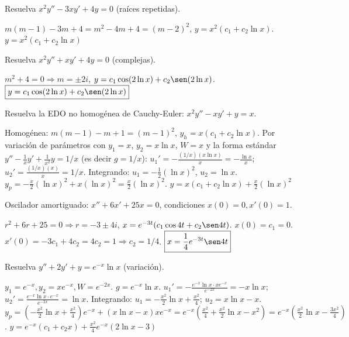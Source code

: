 \begin{prob}
Resuelva $x^2 y'' - 3x y' + 4y = 0$ (raíces repetidas).
\begin{myproof}
$m(m-1)-3m+4=m^2-4m+4=(m-2)^2$, $y=x^2(c_1+c_2\ln x)$. $\boxed{y=x^2(c_1+c_2\ln x)}$
\end{myproof}
\end{prob}

\begin{prob}
Resuelva $x^2 y'' + x y' + 4y = 0$ (complejas).
\begin{myproof}
$m^2+4=0 \Rightarrow m=\pm 2i$, $y=c_1\cos(2\ln x)+c_2\sen(2\ln x)$. $\boxed{y=c_1\cos(2\ln x)+c_2\sen(2\ln x)}$
\end{myproof}
\end{prob}

\begin{prob}
Resuelva la EDO no homogénea de Cauchy-Euler: $x^2 y'' - x y' + y = x$.
\begin{myproof}
Homogénea: $m(m-1)-m+1=(m-1)^2$, $y_h=x(c_1+c_2\ln x)$. Por variación de parámetros con $y_1=x$, $y_2=x\ln x$, $W=x$ y la forma estándar $y''-\frac{1}{x}y'+\frac{1}{x^2}y=1/x$ (es decir $g=1/x$): $u_1'=-\frac{(1/x)(x\ln x)}{x}=-\frac{\ln x}{x}$; $u_2'=\frac{(1/x)(x)}{x}=1/x$. Integrando: $u_1=-\frac{1}{2}(\ln x)^2$, $u_2=\ln x$. $y_p= -\frac{x}{2}(\ln x)^2 + x(\ln x)^2 = \frac{x}{2}(\ln x)^2$. $\boxed{y=x(c_1+c_2\ln x)+\frac{x}{2}(\ln x)^2}$
\end{myproof}
\end{prob}

\begin{prob}
Oscilador amortiguado: $x''+6x'+25x=0$, condiciones $x(0)=0, x'(0)=1$.
\begin{myproof}
$r^2+6r+25=0 \Rightarrow r=-3\pm 4i$, $x=e^{-3t}(c_1\cos 4t+c_2\sen 4t)$. $x(0)=c_1=0$. $x'(0)= -3c_1+4c_2=4c_2=1 \Rightarrow c_2=1/4$. $\boxed{x=\frac{1}{4}e^{-3t}\sen 4t}$
\end{myproof}
\end{prob}

\begin{prob}
Resuelva $y'' + 2y' + y = e^{-x}\ln x$ (variación).
\begin{myproof}
$y_1=e^{-x}, y_2=x e^{-x}, W=e^{-2x}$. $g=e^{-x}\ln x$. $u_1'=-\frac{e^{-x}\ln x \cdot x e^{-x}}{e^{-2x}}=-x\ln x$; $u_2'=\frac{e^{-x}\ln x \cdot e^{-x}}{e^{-2x}}=\ln x$. Integrando: $u_1=-\frac{x^2}{2}\ln x+\frac{x^2}{4}$; $u_2=x\ln x-x$. $y_p=(-\frac{x^2}{2}\ln x+\frac{x^2}{4})e^{-x} + (x\ln x-x)x e^{-x} = e^{-x}(\frac{x^2}{4}+\frac{x^2}{2}\ln x - x^2) = e^{-x}(\frac{x^2}{2}\ln x - \frac{3x^2}{4})$. $\boxed{y=e^{-x}(c_1+c_2x)+\frac{x^2}{4}e^{-x}(2\ln x-3)}$
\end{myproof}
\end{prob}

